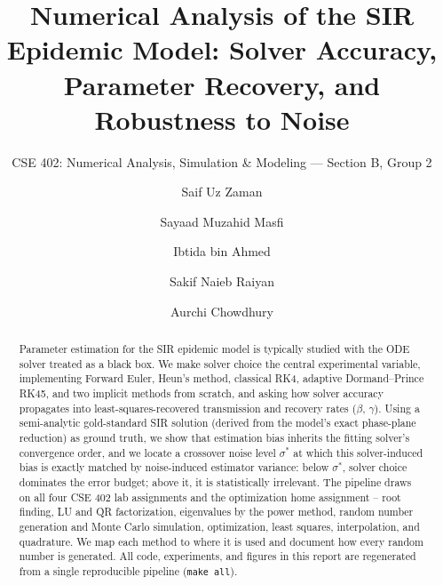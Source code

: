 \documentclass[sigconf,screen=true]{acmart}
\begin{document}
\title{Numerical Analysis of the SIR Epidemic Model: Solver Accuracy, Parameter Recovery, and
Robustness to Noise}
\subtitle{CSE 402: Numerical Analysis, Simulation \& Modeling --- Section B, Group 2}

\author{Saif Uz Zaman}

\author{Sayaad Muzahid Masfi}

\author{Ibtida bin Ahmed}

\author{Sakif Naieb Raiyan}

\author{Aurchi Chowdhury}

\renewcommand{\shortauthors}{Zaman, Masfi, Ahmed, Raiyan, and Chowdhury}

\begin{abstract}
Parameter estimation for the SIR epidemic model is typically studied with the ODE solver treated
as a black box. We make solver choice the central experimental variable, implementing Forward
Euler, Heun's method, classical RK4, adaptive Dormand--Prince RK45, and two implicit methods from
scratch, and asking how solver accuracy propagates into least-squares-recovered transmission and
recovery rates ($\beta$, $\gamma$). Using a semi-analytic gold-standard SIR solution (derived from
the model's exact phase-plane reduction) as ground truth, we show that estimation bias inherits the
fitting solver's convergence order, and we locate a crossover noise level $\sigma^*$ at which this
solver-induced bias is exactly matched by noise-induced estimator variance: below $\sigma^*$,
solver choice dominates the error budget; above it, it is statistically irrelevant. The pipeline
draws on all four CSE 402 lab assignments and the optimization home assignment -- root finding,
LU and QR factorization, eigenvalues by the power method, random number generation and Monte
Carlo simulation, optimization, least squares, interpolation, and quadrature. We map each method to where it is used and document how
every random number is generated. All code, experiments, and figures in this report are regenerated from a single
reproducible pipeline (\texttt{make all}).
\end{abstract}
\end{document}
